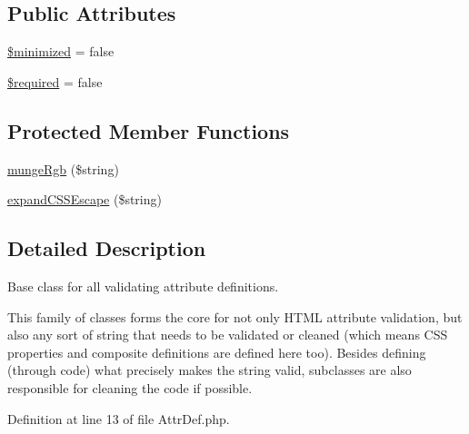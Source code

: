 \subsection*{Public Attributes}
\begin{DoxyCompactItemize}
\item 
\hyperlink{classHTMLPurifier__AttrDef_a970c87d71a9c82781741194fd67a62df}{\$minimized} = false
\item 
\hyperlink{classHTMLPurifier__AttrDef_a900a27ff615bbe5e080f04e46d584367}{\$required} = false
\end{DoxyCompactItemize}
\subsection*{Protected Member Functions}
\begin{DoxyCompactItemize}
\item 
\hyperlink{classHTMLPurifier__AttrDef_aa328733d85f54dcac5ee892f82bd662e}{munge\+Rgb} (\$string)
\item 
\hyperlink{classHTMLPurifier__AttrDef_aacd0d096844eaa658678b459cee9d703}{expand\+C\+S\+S\+Escape} (\$string)
\end{DoxyCompactItemize}


\subsection{Detailed Description}
Base class for all validating attribute definitions.

This family of classes forms the core for not only H\+T\+M\+L attribute validation, but also any sort of string that needs to be validated or cleaned (which means C\+S\+S properties and composite definitions are defined here too). Besides defining (through code) what precisely makes the string valid, subclasses are also responsible for cleaning the code if possible. 

Definition at line 13 of file Attr\+Def.\+php.



